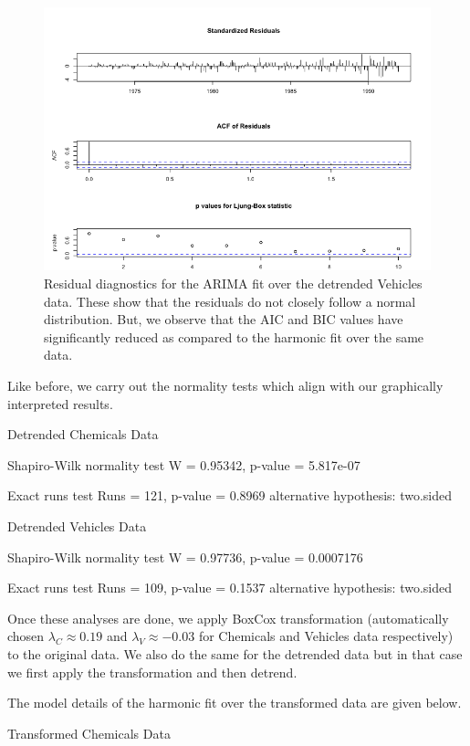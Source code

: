 \begin{enumerate}[label=(\roman*)]
\begin{figure}[!htb]
    \centering
    \includegraphics[width=\linewidth]{Images/P3/TSDiag_Veh.png}
    \caption[Residual diagnostics for the the ARIMA fit over the detrended Vehicles data.]{Residual diagnostics for the ARIMA fit over the detrended Vehicles data. These show that the residuals do not closely follow a normal distribution. But, we observe that the AIC and BIC values have significantly reduced as compared to the harmonic fit over the same data.}
    \label{fig:tsdiag_veh}
\end{figure}

Like before, we carry out the normality tests which align with our graphically interpreted results.
\small\begin{block}
Detrended Chemicals Data

Shapiro-Wilk normality test
W = 0.95342, p-value = 5.817e-07

Exact runs test
Runs = 121, p-value = 0.8969
alternative hypothesis: two.sided

Detrended Vehicles Data

Shapiro-Wilk normality test
W = 0.97736, p-value = 0.0007176

Exact runs test
Runs = 109, p-value = 0.1537
alternative hypothesis: two.sided
\end{block}
\normalsize Once these analyses are done, we apply BoxCox transformation (automatically chosen $\lambda_C \approx 0.19$ and $\lambda_V \approx -0.03$ for Chemicals and Vehicles data respectively) to the original data. We also do the same for the detrended data but in that case we first apply the transformation and then detrend.

The model details of the harmonic fit over the transformed data are given below.
\small\begin{block}
Transformed Chemicals Data


\end{block}
\end{enumerate}
